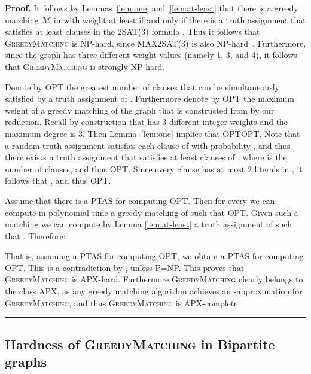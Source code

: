\documentclass[a4paper,11pt]{article}
\newenvironment{proof}[1][Proof]{\noindent\textbf{#1.} }{\ \rule{0.5em}{0.5em}}
\newcommand{\mcal}{\ensuremath{\mathcal{M}}\xspace}
\newcommand{\greedy}{\textsc{GreedyMatching}\xspace}
\begin{document}
\begin{proof}
It follows by Lemmas~\ref{lem:one} and~\ref{lem:at-least} that there is a
greedy matching \mcal in  with weight at least  if
and only if there is a truth assignment that satisfies at least  clauses
in the 2SAT(3) formula . Thus it follows that \textsc{GreedyMatching} is NP-hard,
since MAX2SAT(3) is also NP-hard~\cite{Ausiello1999,RRR98}. Furthermore, since the graph  has three
different weight values (namely 1, 3, and 4), it follows that \textsc{GreedyMatching} is strongly NP-hard.

Denote by OPT the greatest number of clauses
that can be simultaneously satisfied by a truth assignment of .
Furthermore denote by OPT the maximum weight of a
greedy matching of the graph  that is constructed from  by our
reduction. Recall by construction that  has 3 different integer weights
and the maximum degree is 3. Then Lemma~\ref{lem:one} implies that OPTOPT. Note that a
random truth assignment satisfies each clause of  with probability , and thus there exists a truth assignment that satisfies at
least  clauses of , where  is the number of clauses,
and thus OPT. Since every
clause has at most 2 literals in , it follows that , and thus OPT.

Assume that there is a PTAS for computing OPT. Then for
every  we can compute in polynomial time a greedy matching  of  such that OPT. Given such a matching  we can compute by
Lemma \ref{lem:at-least} a truth assignment  of  such that . Therefore:

That is, assuming a PTAS for computing OPT, we obtain a
PTAS for computing OPT. This is a contradiction
by \cite{Ausiello1999}, unless P=NP. This proves that \textsc{GreedyMatching}\xspace is APX-hard. Furthermore \greedy clearly
belongs to the class APX, as any greedy matching algorithm achieves an -approximation for \greedy, and thus 
\greedy is APX-complete.
\end{proof}






















\subsection{Hardness of \greedy in Bipartite graphs
\label{hardness-bipartite-subsec}}
\end{document}
